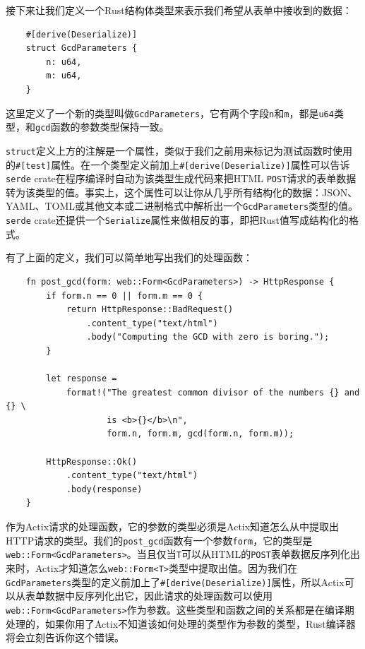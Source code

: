 接下来让我们定义一个Rust结构体类型来表示我们希望从表单中接收到的数据：
\begin{verbatim}
    #[derive(Deserialize)]
    struct GcdParameters {
        n: u64,
        m: u64,
    }
\end{verbatim}

这里定义了一个新的类型叫做\texttt{GcdParameters}，它有两个字段\texttt{n}和\texttt{m}，都是\texttt{u64}类型，和\texttt{gcd}函数的参数类型保持一致。

\texttt{struct}定义上方的注解是一个属性，类似于我们之前用来标记为测试函数时使用的\texttt{\#[test]}属性。在一个类型定义前加上\texttt{\#[derive(Deserialize)]}属性可以告诉\texttt{serde} crate在程序编译时自动为该类型生成代码来把HTML \texttt{POST}请求的表单数据转为该类型的值。事实上，这个属性可以让你从几乎所有结构化的数据：JSON、YAML、TOML或其他文本或二进制格式中解析出一个\texttt{GcdParameters}类型的值。\texttt{serde} crate还提供一个\texttt{Serialize}属性来做相反的事，即把Rust值写成结构化的格式。

有了上面的定义，我们可以简单地写出我们的处理函数：
\begin{verbatim}
    fn post_gcd(form: web::Form<GcdParameters>) -> HttpResponse {
        if form.n == 0 || form.m == 0 {
            return HttpResponse::BadRequest()
                .content_type("text/html")
                .body("Computing the GCD with zero is boring.");
        }

        let response = 
            format!("The greatest common divisor of the numbers {} and {} \
                    is <b>{}</b>\n",
                    form.n, form.m, gcd(form.n, form.m));
        
        HttpResponse::Ok()
            .content_type("text/html")
            .body(response)
    }
\end{verbatim}

作为Actix请求的处理函数，它的参数的类型必须是Actix知道怎么从中提取出HTTP请求的类型。我们的\texttt{post\_gcd}函数有一个参数\texttt{form}，它的类型是\texttt{web::Form<GcdParameters>}。当且仅当\texttt{T}可以从HTML的\texttt{POST}表单数据反序列化出来时，Actix才知道怎么\texttt{web::Form<T>}类型中提取出值。因为我们在\texttt{GcdParameters}类型的定义前加上了\texttt{\#[derive(Deserialize)]}属性，所以Actix可以从表单数据中反序列化出它，因此请求的处理函数可以使用\\
\texttt{web::Form<GcdParameters>}作为参数。这些类型和函数之间的关系都是在编译期处理的，如果你用了Actix不知道该如何处理的类型作为参数的类型，Rust编译器将会立刻告诉你这个错误。

